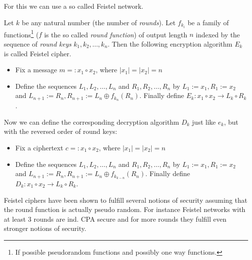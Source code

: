 For this we can use a so called Feistel network.
\begin{definition}
 Let $k$ be any natural number (the number of \emph{rounds}). Let $f_{k_i}$ be a family of functions\protect\footnote{If possible pseudorandom functions and possibly one way functions.} ($f$ is the so called \emph{round function}) of output length $n$ indexed by the sequence of \emph{round keys} $k_1, k_2, \ldots, k_n$. 
 Then the following encryption algorithm $E_k$ is called Feistel cipher. %
 \begin{itemize}
  \item Fix a message $m=:x_1\circ x_2$, where $\left|x_1\right|=\left|x_2\right|=n$
  \item Define the sequences $L_1, L_2, \ldots, L_n$ and $R_1, R_2, \ldots, R_n$ by $L_1:=x_1, R_1:=x_2$ and $L_{n+1}:=R_n, R_{n+1}:=L_n\oplus f_{k_n}(R_n)$. Finally define $E_k:x_1\circ x_2\to L_k\circ R_k$. 
 \end{itemize}
 Now we can define the corresponding decryption algorithm $D_k$ just like $e_k$, but with the reversed order of round keys:
 \begin{itemize}
 	\item Fix a ciphertext $c=:x_1\circ x_2$, where $\left|x_1\right|=\left|x_2\right|=n$
 	\item Define the sequences $L_1, L_2, \ldots, L_n$ and $R_1, R_2, \ldots, R_n$ by $L_1:=x_1, R_1:=x_2$ and $L_{n+1}:=R_n, R_{n+1}:=L_n\oplus f_{k_{k-n}}(R_n)$. Finally define $D_k:x_1\circ x_2\to L_k\circ R_k$. 
 \end{itemize}
\end{definition}
Feistel ciphers have been shown to fulfill several notions of security assuming that the round function is actually pseudo random. For instance Feistel networks with at least $3$ rounds are ind. CPA secure and for more rounds they fulfill even stronger notions of security. %
